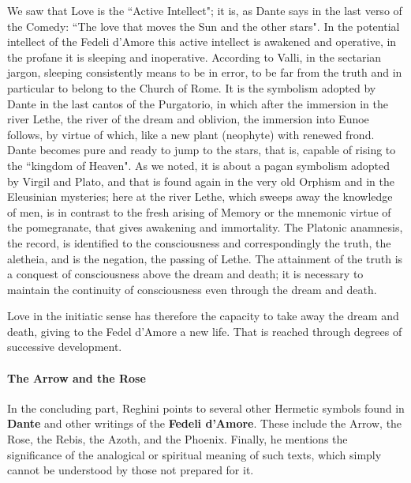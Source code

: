 We saw that Love is the ``Active Intellect"; it is, as Dante says in the last verso of the Comedy: ``The love that moves the Sun and the other stars". In the potential intellect of the Fedeli d'Amore this active intellect is awakened and operative, in the profane it is sleeping and inoperative. According to Valli, in the sectarian jargon, sleeping consistently means to be in error, to be far from the truth and in particular to belong to the Church of Rome. It is the symbolism adopted by Dante in the last cantos of the Purgatorio, in which after the immersion in the river Lethe, the river of the dream and oblivion, the immersion into Eunoe follows, by virtue of which, like a new plant (neophyte) with renewed frond. Dante becomes pure and ready to jump to the stars, that is, capable of rising to the ``kingdom of Heaven". As we noted, it is about a pagan symbolism adopted by Virgil and Plato, and that is found again in the very old Orphism and in the Eleusinian mysteries; here at the river Lethe, which sweeps away the knowledge of men, is in contrast to the fresh arising of Memory or the mnemonic virtue of the pomegranate, that gives awakening and immortality. The Platonic anamnesis, the record, is identified to the consciousness and correspondingly the truth, the aletheia, and is the negation, the passing of Lethe. The attainment of the truth is a conquest of consciousness above the dream and death; it is necessary to maintain the continuity of consciousness even through the dream and death.

Love in the initiatic sense has therefore the capacity to take away the dream and death, giving to the Fedel d'Amore a new life. That is reached through degrees of successive development.

\paragraph{The Arrow and the Rose}

\begin{quotex}
In the concluding part, Reghini points to several other Hermetic symbols found in \textbf{Dante} and other writings of the \textbf{Fedeli d'Amore}. These include the Arrow, the Rose, the Rebis, the Azoth, and the Phoenix. Finally, he mentions the significance of the analogical or spiritual meaning of such texts, which simply cannot be understood by those not prepared for it.

\end{quotex}

